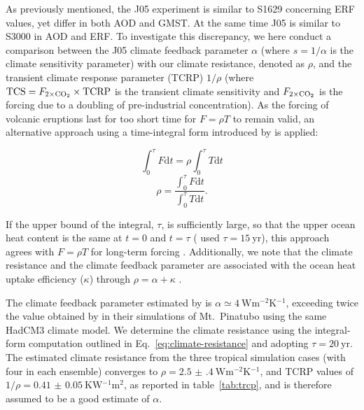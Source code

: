 \documentclass[draft]{agujournal2019}
\begin{document}
  As previously mentioned, the J05 experiment is similar to S1629 concerning ERF values,
  yet differ in both AOD and GMST. At the same time J05 is similar to S3000 in AOD and
  ERF. To investigate this discrepancy, we here conduct a comparison between the J05
  climate feedback parameter \(\alpha\) (where \(s=1/\alpha\) is the climate sensitivity
  parameter) with our climate resistance, denoted as \(\rho\), and the transient climate
  response parameter (TCRP) \(1/\rho\) (where \(\mathrm{TCS}=F_{2\times\ce{CO2}}\times
  \mathrm{TCRP}\) is the transient climate sensitivity and \(F_{2\times\ce{CO2}}\) is
  the forcing due to a doubling of pre-industrial  concentration).
   As the forcing of volcanic eruptions last for too short time
  for \(F=\rho T\) to remain valid, an alternative approach using a time-integral form
  introduced by  is applied:

  \begin{equation}
    \int_0^{\tau}F \mathrm{d}t=\rho\int_{0}^{\tau}T \mathrm{d}t
    \label{eq:climate-resistance-orig}
  \end{equation}
  \begin{equation}
    \rho=\frac{\int_0^{\tau}F \mathrm{d}t}{\int_{0}^{\tau}T \mathrm{d}t}.
    \label{eq:climate-resistance}
  \end{equation}

  If the upper bound of the integral, \(\tau\), is sufficiently large, so that the upper
  ocean heat content is the same at \(t=0\) and \(t=\tau\) ( used
  \(\tau =\SI{15}{\mathrm{yr}}\)), this approach agrees with \(F=\rho T\) for long-term
  forcing \cite{gregory2016}. Additionally, we note that the climate resistance and the
  climate feedback parameter are associated with the ocean heat uptake efficiency
  (\(\kappa\)) through \(\rho =\alpha +\kappa\) \cite{gregory2016}.

  The climate feedback parameter estimated by  is \(\alpha \simeq
  \SI{4}{\watt\metre^{-2}\kelvin^{-1}}\), exceeding twice the value obtained by
   in their simulations of Mt.\ Pinatubo using the same HadCM3
  climate model. We determine the climate resistance using the integral-form computation
  outlined in Eq.~\ref{eq:climate-resistance} and adopting \(\tau
  =\SI{20}{\mathrm{yr}}\). The estimated climate resistance from the three tropical
  simulation cases (with four in each ensemble) converges to \(\rho
  =\SI{2.5(4)}{\watt\metre^{-2}\kelvin^{-1}}\), and TCRP values of
  \(1/\rho=\SI{0.41(5)}{\kelvin\watt^{-1}\metre^{2}}\), as reported in
  table~\ref{tab:trcp}, and is therefore assumed to be a good estimate of \(\alpha\).
\end{document}
